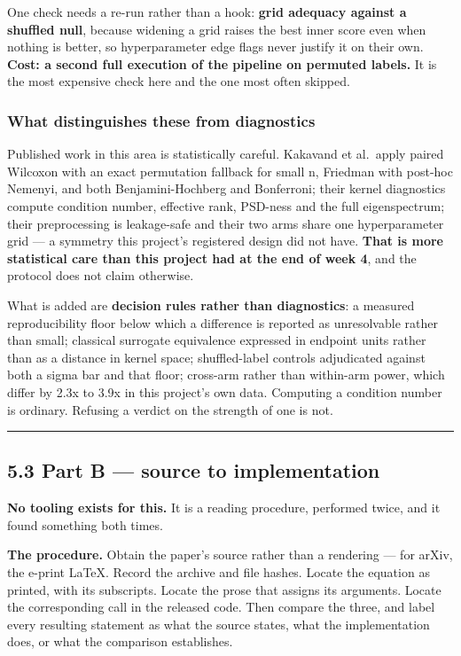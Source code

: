 \documentclass[
  10pt,
]{article}
\begin{document}
One check needs a re-run rather than a hook: \textbf{grid adequacy
against a shuffled null}, because widening a grid raises the best inner
score even when nothing is better, so hyperparameter edge flags never
justify it on their own. \textbf{Cost: a second full execution of the
pipeline on permuted labels.} It is the most expensive check here and
the one most often skipped.

\subsubsection{What distinguishes these from
diagnostics}\label{what-distinguishes-these-from-diagnostics}

Published work in this area is statistically careful. Kakavand et
al.~apply paired Wilcoxon with an exact permutation fallback for small
n, Friedman with post-hoc Nemenyi, and both Benjamini-Hochberg and
Bonferroni; their kernel diagnostics compute condition number, effective
rank, PSD-ness and the full eigenspectrum; their preprocessing is
leakage-safe and their two arms share one hyperparameter grid --- a
symmetry this project's registered design did not have. \textbf{That is
more statistical care than this project had at the end of week 4}, and
the protocol does not claim otherwise.

What is added are \textbf{decision rules rather than diagnostics}: a
measured reproducibility floor below which a difference is reported as
unresolvable rather than small; classical surrogate equivalence
expressed in endpoint units rather than as a distance in kernel space;
shuffled-label controls adjudicated against both a sigma bar and that
floor; cross-arm rather than within-arm power, which differ by 2.3x to
3.9x in this project's own data. Computing a condition number is
ordinary. Refusing a verdict on the strength of one is not.

\begin{center}\rule{0.5\linewidth}{0.5pt}\end{center}

\subsection{5.3 Part B --- source to
implementation}\label{part-b-source-to-implementation}

\textbf{No tooling exists for this.} It is a reading procedure,
performed twice, and it found something both times.

\textbf{The procedure.} Obtain the paper's source rather than a
rendering --- for arXiv, the e-print LaTeX. Record the archive and file
hashes. Locate the equation as printed, with its subscripts. Locate the
prose that assigns its arguments. Locate the corresponding call in the
released code. Then compare the three, and label every resulting
statement as what the source states, what the implementation does, or
what the comparison establishes.
\end{document}
